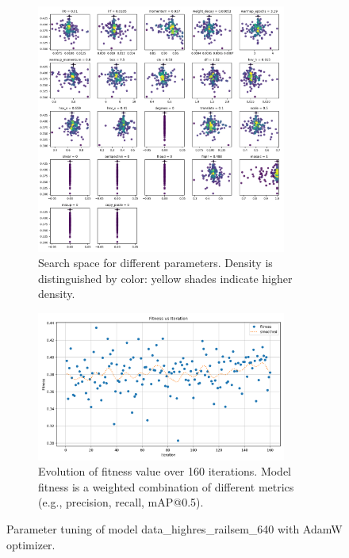 \documentclass[Master,MDS,english]{BASE/twbook} %
\begin{document}
\begin{figure}[H]
\centering
\begin{subfigure}[t]{.5\textwidth}
  \centering
  \includegraphics[width=0.9\textwidth]{images/yolo/highres/adam/tune_scatter_plots}
  \caption{Search space for different parameters. Density is distinguished by color: yellow shades indicate higher density.}
\end{subfigure}%
\begin{subfigure}[t]{.5\textwidth}
  \centering
  \includegraphics[width=0.9\textwidth]{images/yolo/highres/adam/tune_fitness}
  \caption{Evolution of fitness value over 160 iterations. Model fitness is a weighted combination of different metrics (e.g., precision, recall, mAP@0.5).}
  \label{fig:images_from_videos}
\end{subfigure}
\caption{Parameter tuning of model data\_highres\_railsem\_640 with AdamW optimizer.}
\label{fig:yolo_tune_highres_adam}
\end{figure}
\end{document}

